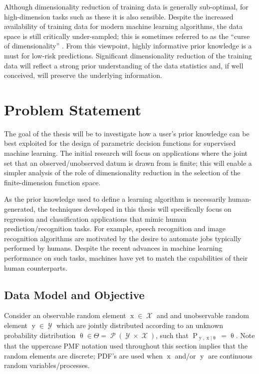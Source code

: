 \documentclass[12pt]{report}
\DeclareMathOperator{\xrm}{\mathrm{x}}
\DeclareMathOperator{\yrm}{\mathrm{y}}
\DeclareMathOperator{\Prm}{\mathrm{P}}
\DeclareMathOperator{\Xcal}{\mathcal{X}}
\DeclareMathOperator{\Ycal}{\mathcal{Y}}
\DeclareMathOperator{\Pcal}{\mathcal{P}}
\begin{document}
Although dimensionality reduction of training data is generally sub-optimal, for high-dimension tasks such as these it is also sensible. Despite the increased availability of training data for modern machine learning algorithms, the data space is still critically under-sampled; this is sometimes referred to as the ``curse of dimensionality'' \cite{bellman}. From this viewpoint, highly informative prior knowledge is a must for low-risk predictions. Significant dimensionality reduction of the training data will reflect a strong prior understanding of the data statistics and, if well conceived, will preserve the underlying information. 














\chapter{Problem Statement} \label{sec:prob}

The goal of the thesis will be to investigate how a user's prior knowledge can be best exploited for the design of parametric decision functions for supervised machine learning. The initial research will focus on applications where the joint set that an observed/unobserved datum is drawn from is finite; this will enable a simpler analysis of the role of dimensionality reduction in the selection of the finite-dimension function space.

As the prior knowledge used to define a learning algorithm is necessarily human-generated, the techniques developed in this thesis will specifically focus on regression and classification applications that mimic human prediction/recognition tasks. For example, speech recognition and image recognition algorithms are motivated by the desire to automate jobs typically performed by humans. Despite the recent advances in machine learning performance on such tasks, machines have yet to match the capabilities of their human counterparts.



\section{Data Model and Objective}

Consider an observable random element $\xrm \in \Xcal$ and and unobservable random element $\yrm \in \Ycal$ which are jointly distributed according to an unknown probability distribution $\uptheta \in \Theta = \Pcal(\Ycal \times \Xcal)$, such that $\Prm_{\yrm,\xrm | \uptheta} = \uptheta$. Note that the uppercase PMF notation used throughout this section implies that the random elements are discrete; PDF's are used when $\xrm$ and/or $\yrm$ are continuous random variables/processes.
\end{document}
